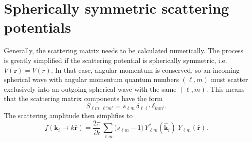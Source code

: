 \documentclass[pra,12pt]{revtex4}
\begin{document}
\section{Spherically symmetric scattering potentials}

Generally, the scattering matrix needs to be calculated numerically.
The process is greatly simplified if the scattering potential is
spherically symmetric, i.e.~$V(\mathbf{r}) = V(r)$.  In that case,
angular momentum is conserved, so an incoming spherical wave with
angular momentum quantum numbers $(\ell,m)$ must scatter exclusively
into an outgoing spherical wave with the same $(\ell,m)$.  This means
that the scattering matrix components have the form
\begin{equation}
  S_{\ell m, \ell'm'} = s_{\ell m}\, \delta_{\ell\ell'}\, \delta_{mm'}.
\end{equation}
The scattering amplitude then simplifies to
\begin{equation}
  f(\mathbf{k}_i \rightarrow k\hat{\mathbf{r}}) =  \frac{2 \pi}{ik}\, \sum_{\ell m} \Big(s_{\ell m} - 1\Big) \, Y_{\ell m}^*(\hat{\mathbf{k}}_i)\; Y_{\ell m}(\hat{\mathbf{r}}).
\end{equation}
\end{document}
